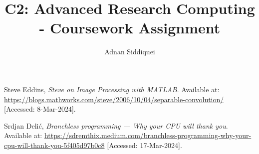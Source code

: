 \documentclass[a4paper,11pt]{article}
\title{\boldmath C2: Advanced Research Computing - Coursework Assignment}
\author{Adnan Siddiquei}
\affiliation{University of Cambridge}
\begin{document}
\maketitle
\flushbottom




% 
% 
% 
% 



\begin{thebibliography}{99}

Steve Eddins,
\textit{Steve on Image Processing with MATLAB}.
Available at: \url{https://blogs.mathworks.com/steve/2006/10/04/separable-convolution/}
[Accessed: 8-Mar-2024].

Srdjan Delić,
\textit{Branchless programming — Why your CPU will thank you}.
Available at: \url{https://sdremthix.medium.com/branchless-programming-why-your-cpu-will-thank-you-5f405d97b0c8}
[Accessed: 17-Mar-2024].

\end{thebibliography}
\end{document}
